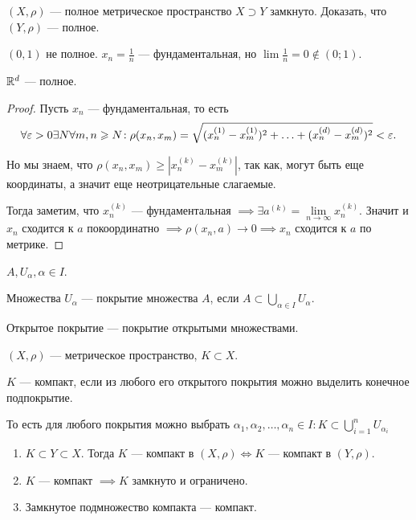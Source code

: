 \begin{exerc}
    $(X, \rho)$ --- полное метрическое пространство  $X \supset Y$ замкнуто. Доказать, что  $(Y, \rho)$ --- полное.
\end{exerc}
\begin{exerc}
    $(0, 1)$ не полное.  $x_n = \frac{1}{n}$ --- фундаментальная, но $\lim \frac{1}{n} = 0 \notin (0; 1)$.
\end{exerc}
\begin{theorem}
    $\mathbb{R}^d$ --- полное.
\end{theorem}
\begin{proof}
    Пусть $x_n$ --- фундаментальная, то есть
     \[
    \forall \varepsilon > 0 \exists N \forall m,n \geqslant N\!: \rho(x_n, x_m) = \sqrt{(x_n^{(1)}-x_m^{(1)})^2 + \ldots + (x_n^{(d)}-x_m^{(d)})^2} < \varepsilon
    .\] 

    Но мы знаем, что $\rho(x_n, x_m) \ge |x_n^{(k)} - x_m^{(k)}|$, так как, могут быть еще координаты, а значит еще неотрицательные слагаемые. 

    Тогда заметим, что $x_n^{(k)}$ --- фундаментальная  $\implies \exists a^{(k)} = \lim\limits_{n \to \infty} x_n^{(k)}$. Значит и  $x_n$ сходится к  $a$ покоординатно  $\implies \rho(x_n, a) \to 0 \implies x_n$ сходится к  $a$ по метрике.
\end{proof}
\begin{definition}
    $A, U_\alpha, \alpha \in I$.

    Множества  $U_\alpha$ --- покрытие множества  $A$, если  $A \subset \bigcup\limits_{\alpha \in I} U_\alpha$.
\end{definition}
\begin{definition}
    Открытое покрытие --- покрытие открытыми множествами.
\end{definition}
\begin{definition}
    $(X, \rho)$ --- метрическое пространство, $K \subset X$.

    $K$ --- компакт, если из любого его открытого покрытия можно выделить конечное подпокрытие. 
\end{definition}
\begin{definition}
    То есть для любого покрытия можно выбрать $\alpha_1, \alpha_2, \ldots, \alpha_n \in I\!: K \subset\bigcup \limits_{i=1}^n U_{\alpha_i}$
\end{definition}
\begin{theorem}
    \begin{enumerate}
        \item $K \subset Y \subset X$. Тогда  $K$ --- компакт в  $(X, \rho) \iff K$ --- компакт в  $(Y, \rho)$.
        \item  $K$ --- компакт  $\implies K$ замкнуто и ограничено.
        \item  Замкнутое подмножество компакта --- компакт.
    \end{enumerate}
\end{theorem}
